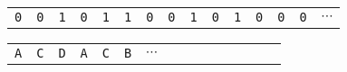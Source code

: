    \begin{tabular}{cc| c| ccc|cc|c|cccc|cc}
         \texttt{0} & \texttt{0} & \texttt{1} & \texttt{0} & \texttt{1} & \texttt{1} & \texttt{0} & \texttt{0} & \texttt{1} & \texttt{0} & \texttt{1} & \texttt{0} & \texttt{0} & \texttt{0} & $\cdots$
    \end{tabular}
    
    \vspace{10pt}
    
    \begin{tabular}{cc c cccccccccccc}
         \texttt{A} & \texttt{C} & \texttt{D} & \texttt{A} & \texttt{C} & \texttt{B} & $\cdots$ &  &  &  &  & &  & & 
    \end{tabular}